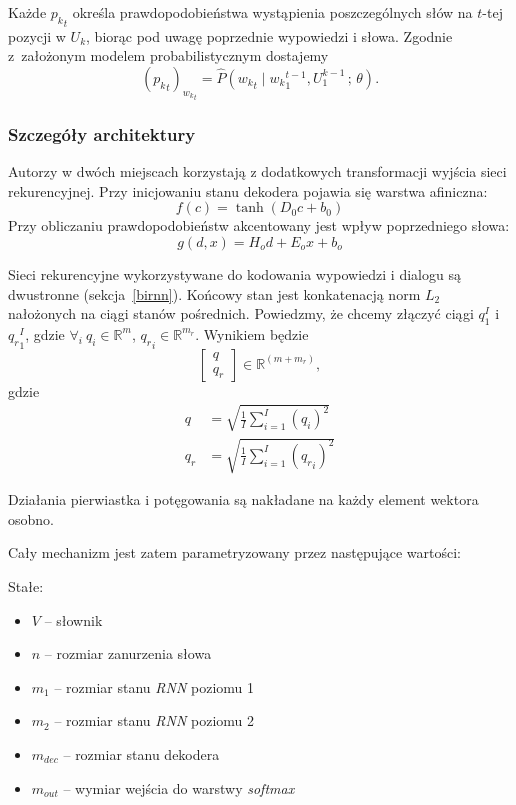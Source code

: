 Każde ${p_k}_t$ określa prawdopodobieństwa wystąpienia poszczególnych słów na $t$-tej pozycji w $U_k$, biorąc pod uwagę poprzednie wypowiedzi i słowa. Zgodnie z~założonym modelem probabilistycznym dostajemy
\[({p_k}_t)_{{w_k}_t} = \hat{P}({w_k}_t \mid {w_k}_1^{t-1}, U_1^{k-1}\, ;\, \theta).\]

\subsubsection{Szczegóły architektury}

Autorzy w dwóch miejscach korzystają z dodatkowych transformacji wyjścia sieci rekurencyjnej. Przy inicjowaniu stanu dekodera pojawia się warstwa afiniczna:
\[f(c) = \tanh(D_0 c + b_0)\]
Przy obliczaniu prawdopodobieństw akcentowany jest wpływ poprzedniego słowa:
\[g(d, x) = H_o d + E_o x + b_o\]

Sieci rekurencyjne wykorzystywane do kodowania wypowiedzi i dialogu są dwustronne (sekcja~\ref{birnn}). Końcowy stan jest konkatenacją norm $L_2$ nałożonych na ciągi stanów pośrednich. Powiedzmy, że chcemy złączyć ciągi $q_1^I$ i ${q_r}_1^I$, gdzie $\forall_i\ q_i \in \mathbb{R}^{m}$, ${q_r}_i \in \mathbb{R}^{m_r}$. Wynikiem będzie
\[
\begin{bmatrix}
    q\\
    q_r
\end{bmatrix} \in \mathbb{R}^{(m + m_r)},
\]
gdzie
\[
\begin{aligned}
    q &= \sqrt{\frac{1}{I} \sum_{i=1}^I (q_i)^2}\\[10pt]
    q_r &= \sqrt{\frac{1}{I} \sum_{i=1}^I ({q_r}_i)^2}
\end{aligned}
\]

\noindent
Działania pierwiastka i potęgowania są nakładane na każdy element wektora osobno.

\noindent
Cały mechanizm jest zatem parametryzowany przez następujące wartości:

Stałe:\vspace{-.3cm}
\begin{itemize}[leftmargin=1.5cm,label={\tiny$\bullet$}]
    \itemsep0em
    \item $V$ -- słownik
    \item $n$ -- rozmiar zanurzenia słowa
    \item $m_1$ -- rozmiar stanu \textit{RNN} poziomu 1
    \item $m_2$ -- rozmiar stanu \textit{RNN} poziomu 2
    \item $m_{dec}$ -- rozmiar stanu dekodera
    \item $m_{out}$ -- wymiar wejścia do warstwy \textit{softmax}
\end{itemize}


